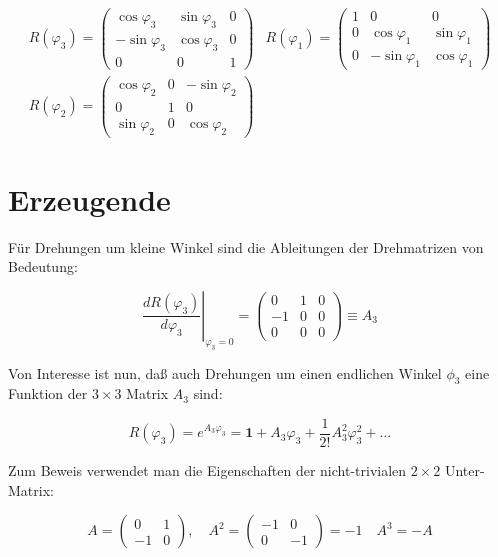 \documentclass[10pt, letterpaper]{article}
\begin{document}
$$
\begin{array}{ll}
R\left(\varphi_{3}\right)=\left(\begin{array}{ccc}
\cos \varphi_{3} & \sin \varphi_{3} & 0 \\
-\sin \varphi_{3} & \cos \varphi_{3} & 0 \\
0 & 0 & 1
\end{array}\right) & R\left(\varphi_{1}\right)=\left(\begin{array}{ccc}
1 & 0 & 0 \\
0 & \cos \varphi_{1} & \sin \varphi_{1} \\
0 & -\sin \varphi_{1} & \cos \varphi_{1}
\end{array}\right) \\
R\left(\varphi_{2}\right)=\left(\begin{array}{ccc}
\cos \varphi_{2} & 0 & -\sin \varphi_{2} \\
0 & 1 & 0 \\
\sin \varphi_{2} & 0 & \cos \varphi_{2}
\end{array}\right) &
\end{array}
$$

\section*{Erzeugende}
Für Drehungen um kleine Winkel sind die Ableitungen der Drehmatrizen von Bedeutung:

$$
\left.\frac{d R\left(\varphi_{3}\right)}{d \varphi_{3}}\right|_{\varphi_{3}=0}=\left(\begin{array}{ccc}
0 & 1 & 0 \\
-1 & 0 & 0 \\
0 & 0 & 0
\end{array}\right) \equiv A_{3}
$$

Von Interesse ist nun, daß auch Drehungen um einen endlichen Winkel $\phi_{3}$ eine Funktion der $3 \times 3$ Matrix $A_{3}$ sind:

$$
R\left(\varphi_{3}\right)=e^{A_{3} \varphi_{3}}=\mathbf{1}+A_{3} \varphi_{3}+\frac{1}{2!} A_{3}^{2} \varphi_{3}^{2}+\ldots
$$

Zum Beweis verwendet man die Eigenschaften der nicht-trivialen $2 \times 2$ Unter-Matrix:

$$
A=\left(\begin{array}{cc}
0 & 1 \\
-1 & 0
\end{array}\right), \quad A^{2}=\left(\begin{array}{cc}
-1 & 0 \\
0 & -1
\end{array}\right)=-1 \quad A^{3}=-A
$$
\end{document}
